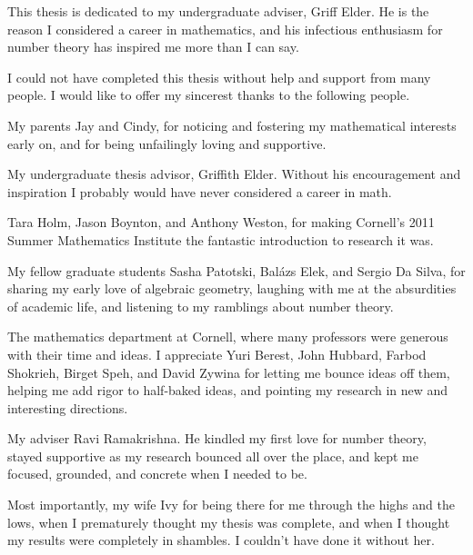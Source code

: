 \documentclass[phd,cornellheadings,tocprelim]{cornell}
\begin{document}
\begin{dedication}
This thesis is dedicated to my undergraduate adviser, Griff Elder. He is the 
reason I considered a career in mathematics, and his infectious enthusiasm 
for number theory has inspired me more than I can say. 
\end{dedication}

\begin{acknowledgements}
I could not have completed this thesis without help and support from many 
people. I would like to offer my sincerest thanks to the following people. 

My parents Jay and Cindy, for noticing and fostering my mathematical 
interests early on, and for being unfailingly loving and supportive. 

My undergraduate thesis advisor, Griffith Elder. Without his encouragement 
and inspiration I probably would have never considered a career in math. 

Tara Holm, Jason Boynton, and Anthony Weston, for making Cornell's 2011 Summer 
Mathematics Institute the fantastic introduction to research it was. 

My fellow graduate students Sasha Patotski, Bal\'azs Elek, and Sergio Da 
Silva, for sharing my early love of algebraic geometry, laughing with me at the 
absurdities of academic life, and listening to my ramblings about number theory. 

The mathematics department at Cornell, where many professors were generous 
with their time and ideas. I appreciate Yuri Berest, John Hubbard, Farbod 
Shokrieh, Birget Speh, and David Zywina for letting me bounce ideas off them, 
helping me add rigor to half-baked ideas, and pointing my research in new and 
interesting directions. 

My adviser Ravi Ramakrishna. He kindled my first love for number theory, 
stayed supportive as my research bounced all over the place, and kept me 
focused, grounded, and concrete when I needed to be. 

Most importantly, my wife Ivy for being there for me through the highs 
and the lows, when I prematurely thought my thesis was complete, and when I 
thought my results were completely in shambles. I couldn't have done it without 
her. 
\end{acknowledgements}





\symlist
\end{document}
